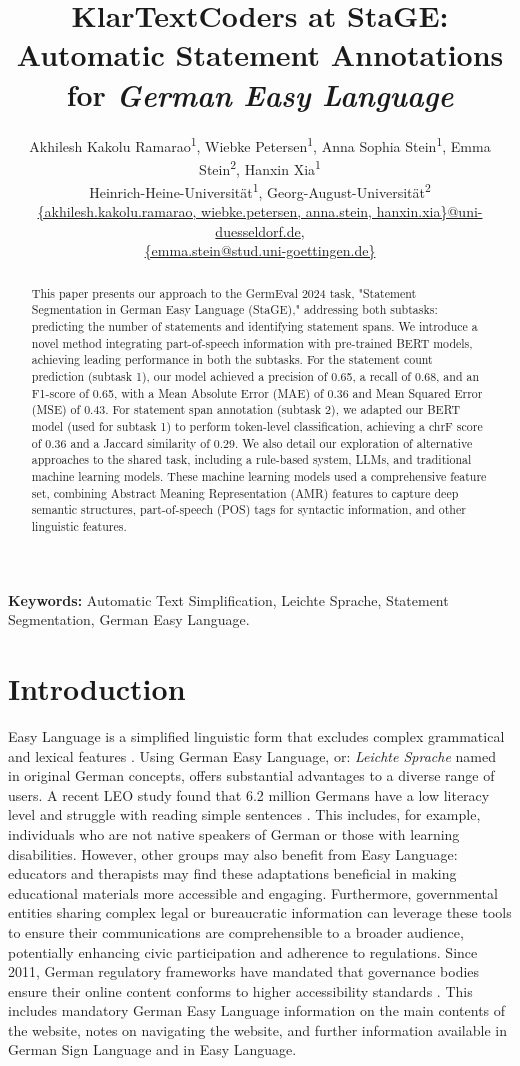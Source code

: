 \documentclass[11pt]{article}
\title{KlarTextCoders at StaGE: \\Automatic Statement Annotations for  \textit{German Easy Language}}
\author{Akhilesh Kakolu Ramarao\textsuperscript{1}, Wiebke Petersen\textsuperscript{1}, Anna Sophia Stein\textsuperscript{1}, Emma Stein\textsuperscript{2}, Hanxin Xia\textsuperscript{1} \\ 
Heinrich-Heine-Universität\textsuperscript{1}, Georg-August-Universität\textsuperscript{2} \\
\url{{akhilesh.kakolu.ramarao, wiebke.petersen, anna.stein, hanxin.xia}@uni-duesseldorf.de},\\ \url{{emma.stein@stud.uni-goettingen.de}}}
\begin{document}
\maketitle
\begin{abstract}
This paper presents our approach to the Germ\-Eval 2024 task, "Statement Segmentation in German Easy Language (StaGE)," addressing both subtasks: predicting the number of statements and identifying statement spans. We introduce a novel method integrating part-of-speech information with pre-trained BERT models, achieving leading performance in both the subtasks. For the statement count prediction (subtask 1), our model achieved a precision of 0.65, a recall of 0.68, and an F1-score of 0.65, with a Mean Absolute Error (MAE) of 0.36 and Mean Squared Error (MSE) of 0.43. For statement span annotation (subtask 2), we adapted our BERT model (used for subtask 1) to perform token-level classification, achieving a chrF score of 0.36 and a Jaccard similarity of 0.29. We also detail our exploration of alternative approaches to the shared task, including a rule-based system, LLMs, and traditional machine learning models. These machine learning models used a comprehensive feature set, combining Abstract Meaning Representation (AMR) features to capture deep semantic structures, part-of-speech (POS) tags for syntactic information, and other linguistic features.

\end{abstract}

\textbf{Keywords:} Automatic Text Simplification, Leichte Sprache,  Statement Segmentation, German Easy Language. 


\section{Introduction}
Easy Language is a simplified linguistic form that excludes complex grammatical and lexical features \citep{maas_ratgeber_2017}. Using German Easy Language, or: \textit{Leichte Sprache} named in original German concepts, offers substantial advantages to a diverse range of users. A recent LEO study found that 6.2 million Germans have a low literacy level and struggle with reading simple sentences \citep{buddeberg_leo_2020}. This includes, for example, individuals who are not native speakers of German or those with learning disabilities. However, other groups may also benefit from Easy Language: educators and therapists may find these adaptations beneficial in making educational materials more accessible and engaging. Furthermore, governmental entities sharing complex legal or bureaucratic information can leverage these tools to ensure their communications are comprehensible to a broader audience, potentially enhancing civic participation and adherence to regulations. Since 2011, German regulatory frameworks have mandated that governance bodies ensure their online content conforms to higher accessibility standards \citep{biv20}. This includes mandatory German Easy Language information on the main contents of the website, notes on navigating the website, and further information available in German Sign Language and in Easy Language.
\end{document}
